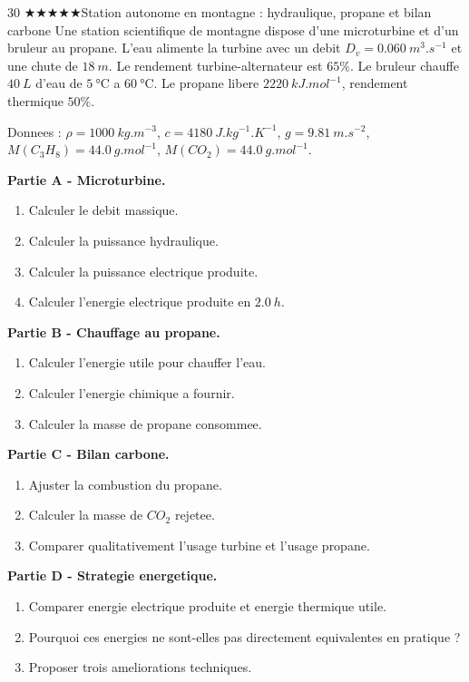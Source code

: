 \documentclass[11pt,a4paper]{article}
\newcommand{\difffive}{\(\bigstar\bigstar\bigstar\bigstar\bigstar\)}
\begin{document}
\begin{probleme}{30 \difffive}{Station autonome en montagne : hydraulique, propane et bilan carbone}
Une station scientifique de montagne dispose d'une microturbine et d'un bruleur au propane. L'eau alimente la turbine avec un debit \(D_v=\SI{0.060}{m^3.s^{-1}}\) et une chute de \(\SI{18}{m}\). Le rendement turbine-alternateur est \(65\%\). Le bruleur chauffe \(\SI{40}{L}\) d'eau de \(\SI{5}{\celsius}\) a \(\SI{60}{\celsius}\). Le propane libere \(\SI{2220}{kJ.mol^{-1}}\), rendement thermique \(50\%\).

Donnees : \(\rho=\SI{1000}{kg.m^{-3}}\), \(c=\SI{4180}{J.kg^{-1}.K^{-1}}\), \(g=\SI{9.81}{m.s^{-2}}\), \(M(C_3H_8)=\SI{44.0}{g.mol^{-1}}\), \(M(CO_2)=\SI{44.0}{g.mol^{-1}}\).

\textbf{Partie A - Microturbine.}
\begin{enumerate}
\item Calculer le debit massique.
\item Calculer la puissance hydraulique.
\item Calculer la puissance electrique produite.
\item Calculer l'energie electrique produite en \(\SI{2.0}{h}\).
\end{enumerate}

\textbf{Partie B - Chauffage au propane.}
\begin{enumerate}[resume]
\item Calculer l'energie utile pour chauffer l'eau.
\item Calculer l'energie chimique a fournir.
\item Calculer la masse de propane consommee.
\end{enumerate}

\textbf{Partie C - Bilan carbone.}
\begin{enumerate}[resume]
\item Ajuster la combustion du propane.
\item Calculer la masse de \(CO_2\) rejetee.
\item Comparer qualitativement l'usage turbine et l'usage propane.
\end{enumerate}

\textbf{Partie D - Strategie energetique.}
\begin{enumerate}[resume]
\item Comparer energie electrique produite et energie thermique utile.
\item Pourquoi ces energies ne sont-elles pas directement equivalentes en pratique ?
\item Proposer trois ameliorations techniques.
\end{enumerate}
\end{probleme}
\end{document}
